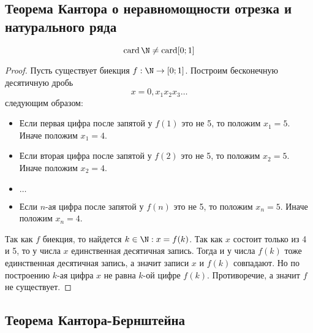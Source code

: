\documentclass{article}
\DeclareMathOperator{\card}{card}
\begin{document}
\subsection{Теорема Кантора о неравномощности отрезка и натурального ряда}
\begin{theorem}
    \label{th:first-cantor-th}
    \[\card \N \neq \card [0;1]\]
\end{theorem}
\begin{proof}
    Пусть существует биекция \(f: \N \rightarrow [0;1]\). Построим бесконечную десятичную дробь \[x = 0,x_1x_2x_3\ldots\] следующим образом: 
    \begin{itemize}
        \item Если первая цифра после запятой у \(f(1)\) это не 5, то положим \(x_1 = 5\). Иначе положим \(x_1 = 4\).
        \item Если вторая цифра после запятой у \(f(2)\) это не 5, то положим \(x_2 = 5\). Иначе положим \(x_2 = 4\).
        \item \(\ldots\)
        \item Если \(n\)-ая цифра после запятой у \(f(n)\) это не 5, то положим \(x_n = 5\). Иначе положим \(x_n = 4\).
    \end{itemize}
    Так как \(f\) биекция, то найдется \(k \in \N: x = f(k)\). Так как \(x\) состоит только из 4 и 5, то у числа \(x\) единственная десятичная запись. Тогда и у числа \(f(k)\) тоже единственная десятичная запись, а значит записи \(x\) и \(f(k)\) совпадают. Но по построению \(k\)-ая цифра \(x\) не равна \(k\)-ой цифре \(f(k)\). Противоречие, а значит \(f\) не существует.
\end{proof}

\subsection{Теорема Кантора-Бернштейна}
\end{document}
